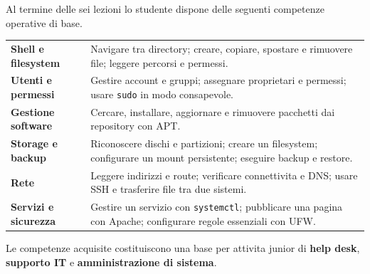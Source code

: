 \documentclass[11pt,a4paper]{article}
\newcommand{\term}[1]{\texttt{#1}}
\begin{document}
Al termine delle sei lezioni lo studente dispone delle seguenti competenze
operative di base.

\begin{tabularx}{\textwidth}{>{\bfseries\color{LinuxBlue}}p{3.5cm} X}
  Shell e filesystem & Navigare tra directory; creare, copiare, spostare e
                       rimuovere file; leggere percorsi e permessi. \\
  Utenti e permessi & Gestire account e gruppi; assegnare proprietari e permessi;
                      usare \term{sudo} in modo consapevole. \\
  Gestione software & Cercare, installare, aggiornare e rimuovere pacchetti dai
                      repository con APT. \\
  Storage e backup & Riconoscere dischi e partizioni; creare un filesystem;
                     configurare un mount persistente; eseguire backup e restore. \\
  Rete & Leggere indirizzi e route; verificare connettivita e DNS; usare SSH e
         trasferire file tra due sistemi. \\
  Servizi e sicurezza & Gestire un servizio con \term{systemctl}; pubblicare una
                        pagina con Apache; configurare regole essenziali con UFW. \\
\end{tabularx}

\begin{infobox}[title={Profilo in uscita}]
  Le competenze acquisite costituiscono una base per attivita junior di
  \textbf{help desk}, \textbf{supporto IT} e \textbf{amministrazione di sistema}.
\end{infobox}
\end{document}

